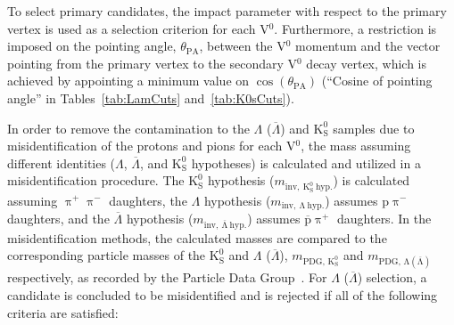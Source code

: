 \documentclass[ALICE,manyauthors]{cernphprep}
\newcommand{\Lam}{$\Lambda$\xspace}
\newcommand{\ALam}{$\overline{\Lambda}$\xspace}
\newcommand{\LamALam}{$\Lambda$ ($\overline{\Lambda}$)\xspace}
\newcommand{\Ks}{$\mathrm{K^{0}_{S}}$\xspace}
\newcommand{\Vz}{V$^{0}$\xspace}
\begin{document}
To select primary candidates, the impact parameter with respect to the primary vertex is used as a selection criterion for each \Vz.
Furthermore, a restriction is imposed on the pointing angle, $\theta_{\mathrm{PA}}$, between the \Vz momentum and the vector pointing from the primary vertex to the secondary \Vz decay vertex, which is achieved by appointing a minimum value on $\cos(\theta_{\mathrm{PA}})$ (``Cosine of pointing angle'' in Tables~\ref{tab:LamCuts} and~\ref{tab:K0sCuts}).

\begin{comment}
In order to remove the contamination to the \LamALam and \Ks samples due to misidentification of the protons and pions for each \Vz, the mass assuming different identities (\Lam, \ALam, \Ks)\footnote[1]
{
For the misidentification cuts, the mass assuming \Ks hypothesis ($m_{\mathrm{inv,~ K^{0}_{S}~ hyp.}}$) is calculated assuming $\uppi^{+}\uppi^{-}$ daughters, the mass assuming \Lam hypothesis ($m_{\mathrm{inv,~ \Lambda~ hyp.}}$) is calculated assuming p$\uppi^{-}$ daughters, and the mass assuming \ALam hypothesis ($m_{\mathrm{inv,~ \overline{\Lambda}~ hyp.}}$) is calculated assuming $\overline{\mathrm{p}}\uppi^{+}$ daughters. 
Additionally, $m_{\mathrm{PDG,\,K^{0}_{S}}}$ and $m_{\mathrm{PDG,\,\Lambda(\overline{\Lambda})}}$ denote the particle masses of the \Ks and \LamALam, respectively, as recorded by the Particle Data Group~\cite{PhysRevD.98.030001}.
}
is calculated and utilized in a set of misidentification cuts.
For \LamALam selection, a candidate is assumed to be misidentified and is rejected if all of the following criteria are satisfied:
\end{comment}

In order to remove the contamination to the \LamALam and \Ks samples due to misidentification of the protons and pions for each \Vz, the mass assuming different identities (\Lam, \ALam, and \Ks hypotheses) is calculated and utilized in a misidentification procedure.
The \Ks hypothesis ($m_{\mathrm{inv,~ K^{0}_{S}~ hyp.}}$) is calculated assuming $\uppi^{+}\uppi^{-}$ daughters, the \Lam hypothesis ($m_{\mathrm{inv,~ \Lambda~ hyp.}}$) assumes p$\uppi^{-}$ daughters, and the \ALam hypothesis ($m_{\mathrm{inv,~ \overline{\Lambda}~ hyp.}}$) assumes $\overline{\mathrm{p}}\uppi^{+}$ daughters. 
In the misidentification methods, the calculated masses are compared to the corresponding particle masses of the \Ks and \LamALam, $m_{\mathrm{PDG,\,K^{0}_{S}}}$ and $m_{\mathrm{PDG,\,\Lambda(\overline{\Lambda})}}$ respectively, as recorded by the Particle Data Group~\cite{PhysRevD.98.030001}.
For \LamALam selection, a candidate is concluded to be misidentified and is rejected if all of the following criteria are satisfied:
\end{document}
